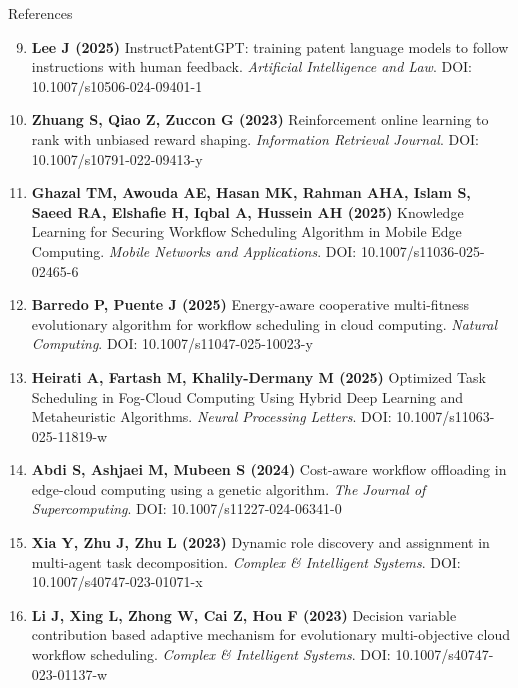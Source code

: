 \begin{frame}{References}
\scriptsize
{}
\begin{enumerate}\setcounter{enumi}{8}\itemsep0.28em\leftskip=-0.55em
\item \textbf{Lee J (2025)} InstructPatentGPT: training patent language models to follow instructions with human feedback. \textit{Artificial Intelligence and Law}. DOI: 10.1007/s10506-024-09401-1
\item \textbf{Zhuang S, Qiao Z, Zuccon G (2023)} Reinforcement online learning to rank with unbiased reward shaping. \textit{Information Retrieval Journal}. DOI: 10.1007/s10791-022-09413-y
\item \textbf{Ghazal TM, Awouda AE, Hasan MK, Rahman AHA, Islam S, Saeed RA, Elshafie H, Iqbal A, Hussein AH (2025)} Knowledge Learning for Securing Workflow Scheduling Algorithm in Mobile Edge Computing. \textit{Mobile Networks and Applications}. DOI: 10.1007/s11036-025-02465-6
\item \textbf{Barredo P, Puente J (2025)} Energy-aware cooperative multi-fitness evolutionary algorithm for workflow scheduling in cloud computing. \textit{Natural Computing}. DOI: 10.1007/s11047-025-10023-y
\item \textbf{Heirati A, Fartash M, Khalily-Dermany M (2025)} Optimized Task Scheduling in Fog-Cloud Computing Using Hybrid Deep Learning and Metaheuristic Algorithms. \textit{Neural Processing Letters}. DOI: 10.1007/s11063-025-11819-w
\item \textbf{Abdi S, Ashjaei M, Mubeen S (2024)} Cost-aware workflow offloading in edge-cloud computing using a genetic algorithm. \textit{The Journal of Supercomputing}. DOI: 10.1007/s11227-024-06341-0
\item \textbf{Xia Y, Zhu J, Zhu L (2023)} Dynamic role discovery and assignment in multi-agent task decomposition. \textit{Complex \& Intelligent Systems}. DOI: 10.1007/s40747-023-01071-x
\item \textbf{Li J, Xing L, Zhong W, Cai Z, Hou F (2023)} Decision variable contribution based adaptive mechanism for evolutionary multi-objective cloud workflow scheduling. \textit{Complex \& Intelligent Systems}. DOI: 10.1007/s40747-023-01137-w
\end{enumerate}
\end{frame}

